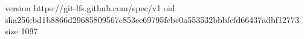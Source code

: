 version https://git-lfs.github.com/spec/v1
oid sha256:bd1b8866d29685809567e853ee69795febc0a553532bbbfcfd66437adbf12773
size 1097
